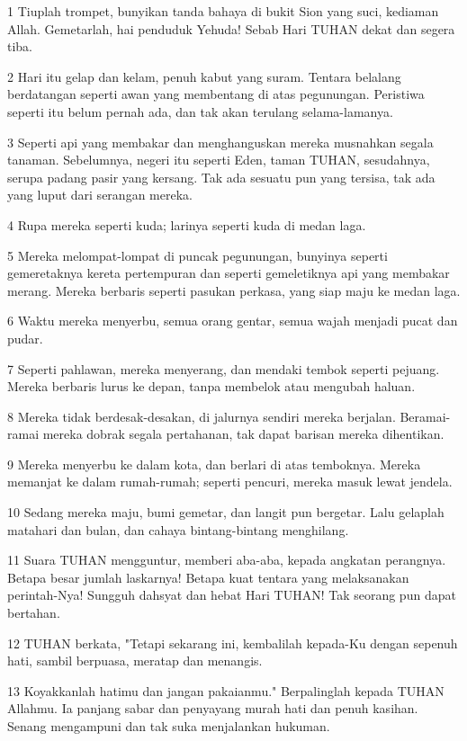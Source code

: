 \par 1 Tiuplah trompet, bunyikan tanda bahaya di bukit Sion yang suci, kediaman Allah. Gemetarlah, hai penduduk Yehuda! Sebab Hari TUHAN dekat dan segera tiba.
\par 2 Hari itu gelap dan kelam, penuh kabut yang suram. Tentara belalang berdatangan seperti awan yang membentang di atas pegunungan. Peristiwa seperti itu belum pernah ada, dan tak akan terulang selama-lamanya.
\par 3 Seperti api yang membakar dan menghanguskan mereka musnahkan segala tanaman. Sebelumnya, negeri itu seperti Eden, taman TUHAN, sesudahnya, serupa padang pasir yang kersang. Tak ada sesuatu pun yang tersisa, tak ada yang luput dari serangan mereka.
\par 4 Rupa mereka seperti kuda; larinya seperti kuda di medan laga.
\par 5 Mereka melompat-lompat di puncak pegunungan, bunyinya seperti gemeretaknya kereta pertempuran dan seperti gemeletiknya api yang membakar merang. Mereka berbaris seperti pasukan perkasa, yang siap maju ke medan laga.
\par 6 Waktu mereka menyerbu, semua orang gentar, semua wajah menjadi pucat dan pudar.
\par 7 Seperti pahlawan, mereka menyerang, dan mendaki tembok seperti pejuang. Mereka berbaris lurus ke depan, tanpa membelok atau mengubah haluan.
\par 8 Mereka tidak berdesak-desakan, di jalurnya sendiri mereka berjalan. Beramai-ramai mereka dobrak segala pertahanan, tak dapat barisan mereka dihentikan.
\par 9 Mereka menyerbu ke dalam kota, dan berlari di atas temboknya. Mereka memanjat ke dalam rumah-rumah; seperti pencuri, mereka masuk lewat jendela.
\par 10 Sedang mereka maju, bumi gemetar, dan langit pun bergetar. Lalu gelaplah matahari dan bulan, dan cahaya bintang-bintang menghilang.
\par 11 Suara TUHAN mengguntur, memberi aba-aba, kepada angkatan perangnya. Betapa besar jumlah laskarnya! Betapa kuat tentara yang melaksanakan perintah-Nya! Sungguh dahsyat dan hebat Hari TUHAN! Tak seorang pun dapat bertahan.
\par 12 TUHAN berkata, "Tetapi sekarang ini, kembalilah kepada-Ku dengan sepenuh hati, sambil berpuasa, meratap dan menangis.
\par 13 Koyakkanlah hatimu dan jangan pakaianmu." Berpalinglah kepada TUHAN Allahmu. Ia panjang sabar dan penyayang murah hati dan penuh kasihan. Senang mengampuni dan tak suka menjalankan hukuman.
